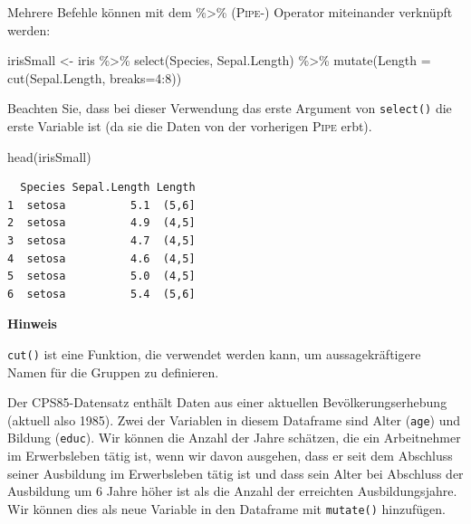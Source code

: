 \documentclass[
  ngerman,
]{scrbook}
\newenvironment{Shaded}{\begin{snugshade}}{\end{snugshade}}
\newcommand{\AttributeTok}[1]{\textcolor[rgb]{0.77,0.63,0.00}{#1}}
\newcommand{\DecValTok}[1]{\textcolor[rgb]{0.00,0.00,0.81}{#1}}
\newcommand{\FunctionTok}[1]{\textcolor[rgb]{0.00,0.00,0.00}{#1}}
\newcommand{\NormalTok}[1]{#1}
\newcommand{\OtherTok}[1]{\textcolor[rgb]{0.56,0.35,0.01}{#1}}
\newcommand{\SpecialCharTok}[1]{\textcolor[rgb]{0.00,0.00,0.00}{#1}}
\newenvironment{hinweis}[1]
  {
  \begin{itemize}
  \renewcommand{\labelitemi}{
    \raisebox{1.8\height}[0pt][0pt]{
      {\setkeys{Gin}{width=7em,keepaspectratio}
        {\Large \textcolor{dark-fom-green}\faHandORight}}
        }
  }
  \begin{blackbox}
        \bgroup\color{dark-fom-green}
          {\textbf{Hinweis}}
        \egroup
  \item
  }
  {
  \end{blackbox}
  \end{itemize}
  }
\begin{document}
Mehrere Befehle können mit dem \%\textgreater\% (\textsc{Pipe}-) Operator miteinander verknüpft werden:

\begin{Shaded}
\begin{Highlighting}[]
\NormalTok{irisSmall }\OtherTok{\textless{}{-}}\NormalTok{ iris }\SpecialCharTok{\%\textgreater{}\%}
  \FunctionTok{select}\NormalTok{(Species, Sepal.Length) }\SpecialCharTok{\%\textgreater{}\%}
  \FunctionTok{mutate}\NormalTok{(}\AttributeTok{Length =} \FunctionTok{cut}\NormalTok{(Sepal.Length, }\AttributeTok{breaks=}\DecValTok{4}\SpecialCharTok{:}\DecValTok{8}\NormalTok{))}
\end{Highlighting}
\end{Shaded}

Beachten Sie, dass bei dieser Verwendung das erste Argument von \texttt{select()} die erste Variable ist (da sie die Daten von der vorherigen \textsc{Pipe} erbt).

\begin{Shaded}
\begin{Highlighting}[]
\FunctionTok{head}\NormalTok{(irisSmall)}
\end{Highlighting}
\end{Shaded}

\begin{verbatim}
  Species Sepal.Length Length
1  setosa          5.1  (5,6]
2  setosa          4.9  (4,5]
3  setosa          4.7  (4,5]
4  setosa          4.6  (4,5]
5  setosa          5.0  (4,5]
6  setosa          5.4  (5,6]
\end{verbatim}

\begin{hinweis}{hinweis}
\texttt{cut()} ist eine Funktion, die verwendet werden kann, um aussagekräftigere Namen für die Gruppen zu definieren.

\end{hinweis}

Der \textsc{CPS85}-Datensatz enthält Daten aus einer aktuellen Bevölkerungserhebung (aktuell also 1985). Zwei der Variablen in diesem Dataframe sind Alter (\texttt{age}) und Bildung (\texttt{educ}). Wir können die Anzahl der Jahre schätzen, die ein Arbeitnehmer im Erwerbsleben tätig ist, wenn wir davon ausgehen, dass er seit dem Abschluss seiner Ausbildung im Erwerbsleben tätig ist und dass sein Alter bei Abschluss der Ausbildung um 6 Jahre höher ist als die Anzahl der erreichten Ausbildungsjahre. Wir können dies als neue Variable in den Dataframe mit \texttt{mutate()} hinzufügen.
\end{document}
